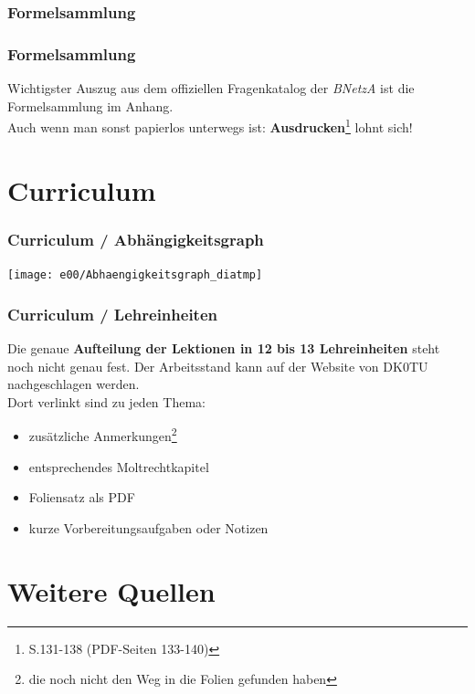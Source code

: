\subsubsection{Formelsammlung}

\begin{frame}
    \frametitle{Formelsammlung}

    Wichtigster Auszug aus dem offiziellen Fragenkatalog der \emph{BNetzA} ist
    die Formelsammlung im Anhang. \\[3em]

    Auch wenn man sonst papierlos unterwegs ist:
    \textbf{Ausdrucken}\footnote{S.131-138 (PDF-Seiten 133-140)} lohnt sich!

\end{frame}

\section{Curriculum}

\begin{frame}
    \frametitle{Curriculum / Abhängigkeitsgraph}

    \texttt{[image: e00/Abhaengigkeitsgraph\_diatmp]}

\end{frame}

\begin{frame}
    \frametitle{Curriculum / Lehreinheiten}

    Die genaue \textbf{Aufteilung der Lektionen in 12 bis 13 Lehreinheiten}
    steht noch nicht genau fest. Der Arbeitsstand kann auf der Website von
    DK0TU\hyperlink{refs}{\cite{curr}} nachgeschlagen werden. \\[2em]

    Dort verlinkt sind zu jeden Thema:

    \begin{itemize}
        \item zusätzliche Anmerkungen\footnote{die noch nicht den Weg in die
              Folien gefunden haben}
        \item entsprechendes Moltrechtkapitel
        \item Foliensatz als PDF
        \item kurze Vorbereitungsaufgaben oder Notizen
    \end{itemize}

\end{frame}

\section{Weitere Quellen}

